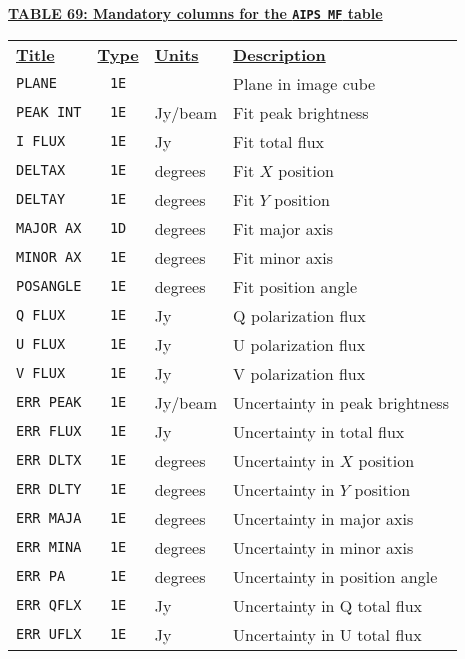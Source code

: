 \documentclass[twoside]{article}
\begin{document}
\begin{center}
\underline{\bf{TABLE 69: Mandatory columns for the {\tt AIPS MF} table}}\\
\begin{tabular}{lcll}
\noalign{\vspace{2pt}} \label{ta:MFcols}
\underline{{\bf Title\vphantom{y}}} & \underline{\bf{Type}} &
   \underline{{\bf Units\vphantom{y}}} & \underline{\bf{Description}} \\
\noalign{\vspace{2pt}}
{\tt PLANE}    & {\tt 1E} &         & Plane in image cube \\
{\tt PEAK INT} & {\tt 1E} & Jy/beam & Fit peak brightness \\
{\tt I FLUX}   & {\tt 1E} & Jy      & Fit total flux \\
{\tt DELTAX}   & {\tt 1E} & degrees & Fit $X$ position \\
{\tt DELTAY}   & {\tt 1E} & degrees & Fit $Y$ position \\
{\tt MAJOR AX} & {\tt 1D} & degrees & Fit major axis \\
{\tt MINOR AX} & {\tt 1E} & degrees & Fit minor axis \\
{\tt POSANGLE} & {\tt 1E} & degrees & Fit position angle \\
{\tt Q FLUX}   & {\tt 1E} & Jy      & Q polarization flux \\
{\tt U FLUX}   & {\tt 1E} & Jy      & U polarization flux \\
{\tt V FLUX}   & {\tt 1E} & Jy      & V polarization flux \\
{\tt ERR PEAK} & {\tt 1E} & Jy/beam & Uncertainty in peak brightness \\
{\tt ERR FLUX} & {\tt 1E} & Jy      & Uncertainty in total flux \\
{\tt ERR DLTX} & {\tt 1E} & degrees & Uncertainty in $X$ position \\
{\tt ERR DLTY} & {\tt 1E} & degrees & Uncertainty in $Y$ position \\
{\tt ERR MAJA} & {\tt 1E} & degrees & Uncertainty in major axis \\
{\tt ERR MINA} & {\tt 1E} & degrees & Uncertainty in minor axis \\
{\tt ERR PA}   & {\tt 1E} & degrees & Uncertainty in position angle \\
{\tt ERR QFLX} & {\tt 1E} & Jy      & Uncertainty in Q total flux \\
{\tt ERR UFLX} & {\tt 1E} & Jy      & Uncertainty in U total flux \\

\end{tabular}
\end{center}
\end{document}
